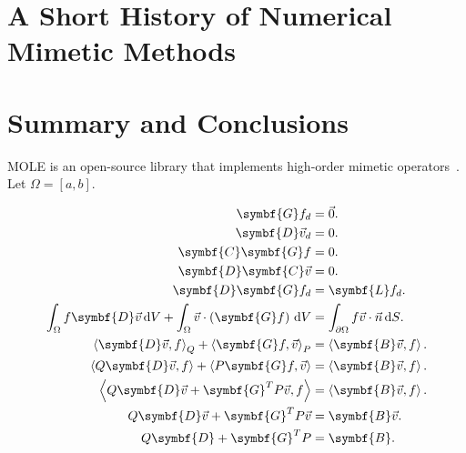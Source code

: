 \section{A Short History of Numerical Mimetic Methods}

\section{Summary and Conclusions}

MOLE is an open-source library that implements high-order mimetic
operators~\cite{Corbino2024}.
Let $\Omega=\left[a,b\right]$.

\begin{align*}
	\symbf{G}f_{d}                           & =
	\vec{0}.                                     \\
	\symbf{D}\vec{v}_{d}                     & =
	0.                                           \\
	\symbf{C}\symbf{G}f                      & =
	0.                                           \\
	\symbf{D}\symbf{C}\vec{v}                & =
	0.                                           \\
	\symbf{D}\symbf{G}f_{d}                  & =
	\symbf{L}f_{d}.                              \\
	\int_{\Omega}
	f\symbf{D}\vec{v}\dl V+
	\int_{\Omega}
	\vec{v}\cdot\left(\symbf{G}f\right)\dl V & =
	\int_{\partial\Omega}
	f\vec{v}\cdot\vec{n}\dl S.                   \\
	{\left\langle
	\symbf{D}\vec{v},
	f
	\right\rangle}_{Q}+
	{\left\langle
	\symbf{G}f,
	\vec{v}
	\right\rangle}_{P}                       & =
	\left\langle
	\symbf{B}\vec{v},
	f
	\right\rangle.                               \\
	\left\langle
	Q\symbf{D}\vec{v},
	f
	\right\rangle+
	\left\langle
	P\symbf{G}f,
	\vec{v}
	\right\rangle                            & =
	\left\langle
	\symbf{B}\vec{v},
	f
	\right\rangle.                               \\
	\left\langle
	Q\symbf{D}\vec{v}+
	\symbf{G}^{T}P\vec{v},
	f
	\right\rangle                            & =
	\left\langle
	\symbf{B}\vec{v},
	f
	\right\rangle.                               \\
	Q\symbf{D}\vec{v}+
	\symbf{G}^{T}P\vec{v}                    & =
	\symbf{B}\vec{v}.                            \\
	Q\symbf{D}+
	\symbf{G}^{T}P                           & =
	\symbf{B}.
\end{align*}

